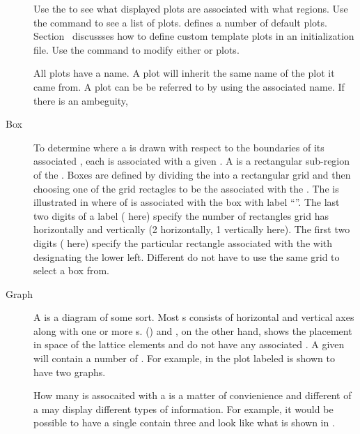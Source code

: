 \begin{description}
Use the  to see what displayed plots are associated with what regions. Use the
 command to see a list of  plots. \tao defines a number of
default  plots. Section~ discussses how to define custom template
plots in an initialization file. Use the  command to modify either  or
 plots.

All plots have a name. A  plot will inherit the same name of the  plot it
came from. A  plot can be be referred to by using the associated  name. If there
is an ambeguity, 

%
\item[Box] \Newline
To determine where a  is drawn with respect to the boundaries of its associated ,
each  is associated with a given . A  is a rectangular sub-region of the
. Boxes are defined by dividing the  into a rectangular grid and then choosing one
of the grid rectagles to be the  associated with the . The is illustrated in
 where  of  is associated with the box with label
``''.  The last two digits of a  label ( here) specify the number of
rectangles grid has horizontally and vertically (2 horizontally, 1 vertically here). The first two
digits ( here) specify the particular rectangle associated with the  with 
designating the lower left. Different  do not have to use the same grid to select a box
from.
%
\item[Graph] \Newline
A  is a diagram of some sort.  Most s consists of horizontal and vertical axes
along with one or more s.  () and 
, on the other hand, shows the placement in space of the lattice elements and do not have
any associated . A given  will contain a number of . For example, in
 the plot labeled  is shown to have two graphs.

How many  is assocaited with a  is a matter of convienience and different
 of a  may display different types of information. For example, it would be
possible to have a single  contain three  and look like what is shown in
.


\end{description}
